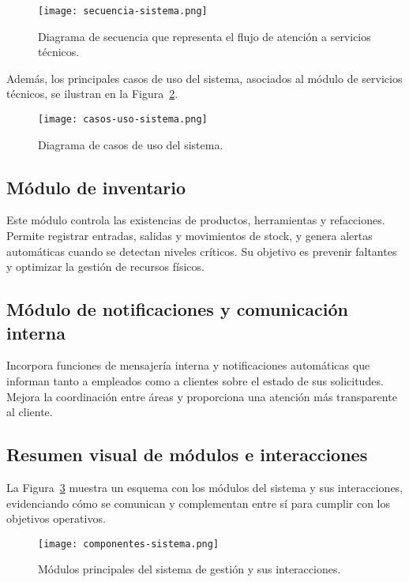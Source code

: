 	\begin{figure}[H]
		\centering
		\texttt{[image: secuencia-sistema.png]}
		\caption{Diagrama de secuencia que representa el flujo de atención a servicios técnicos.}
		\label{fig:secuencia}
	\end{figure}
	
	Además, los principales casos de uso del sistema, asociados al módulo de servicios técnicos, se ilustran en la Figura~\ref{fig:casosuso}.
	
	\begin{figure}[H]
		\centering
		\texttt{[image: casos-uso-sistema.png]}
		\caption{Diagrama de casos de uso del sistema.}
		\label{fig:casosuso}
	\end{figure}
	
	\subsection*{Módulo de inventario}
	
	Este módulo controla las existencias de productos, herramientas y refacciones. Permite registrar entradas, salidas y movimientos de stock, y genera alertas automáticas cuando se detectan niveles críticos. Su objetivo es prevenir faltantes y optimizar la gestión de recursos físicos.
	
	\subsection*{Módulo de notificaciones y comunicación interna}
	
	Incorpora funciones de mensajería interna y notificaciones automáticas que informan tanto a empleados como a clientes sobre el estado de sus solicitudes. Mejora la coordinación entre áreas y proporciona una atención más transparente al cliente.
	
	\subsection*{Resumen visual de módulos e interacciones}
	
	La Figura~\ref{fig:modulos} muestra un esquema con los módulos del sistema y sus interacciones, evidenciando cómo se comunican y complementan entre sí para cumplir con los objetivos operativos.
	
	\begin{figure}[H]
		\centering
		\texttt{[image: componentes-sistema.png]}
		\caption{Módulos principales del sistema de gestión y sus interacciones.}
		\label{fig:modulos}
	\end{figure}
	







